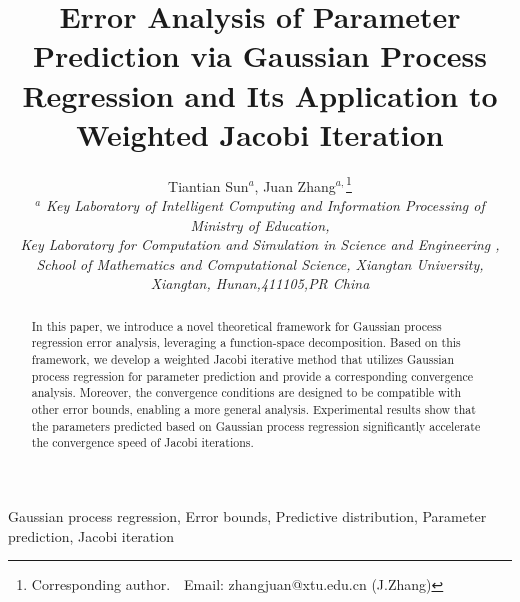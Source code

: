 \documentclass[preprint,review,sort&compress,3p]{elsarticle}
\begin{document}
\begin{frontmatter}
	
	
	

	\title{{  Error Analysis of Parameter Prediction via Gaussian Process Regression and Its Application to Weighted Jacobi Iteration}}
	
	\author{Tiantian Sun$^{a}$, Juan Zhang$^{a,}$\footnote{Corresponding author.~~Email: zhangjuan@xtu.edu.cn  (J.Zhang)}\\
	$^a$ {\it Key Laboratory of Intelligent Computing and Information Processing of Ministry of Education, \\
		Key Laboratory for Computation and Simulation in Science and Engineering ,\\
		School of Mathematics and Computational Science, Xiangtan University, Xiangtan, Hunan,{\rm 411105},PR China}
	}
	\begin{abstract}
		
In this paper, we introduce a novel theoretical framework for Gaussian process regression error analysis, leveraging a function-space decomposition. Based on this framework, we develop a weighted Jacobi iterative method that utilizes Gaussian process regression for parameter prediction and provide a corresponding convergence analysis. Moreover, the convergence conditions are designed to be compatible with other error bounds, enabling a more general analysis. Experimental results show that the parameters predicted based on Gaussian process regression significantly accelerate the convergence speed of Jacobi iterations.
		
	\end{abstract}
	
	\begin{keyword}
		Gaussian process regression, Error bounds, Predictive distribution, Parameter prediction, Jacobi iteration
	\end{keyword}
\end{frontmatter}
\end{document}
